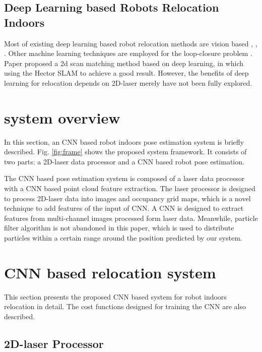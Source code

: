 \documentclass[journal]{IEEEtran}
\begin{document}
\subsection{Deep Learning based Robots Relocation Indoors }

Most of existing deep learning based robot relocation methods are vision based  \cite{kendall2015posenet}, \cite{kuse2019learning}, \cite{zhou2017unsupervised}. Other machine learning techniques are employed for the loop-closure problem \cite{yin2018synchronous}  \cite{chen2017deep}. Paper \cite{li2017deep} proposed a 2d scan matching method based on deep learning, in which using the Hector SLAM \cite{kohlbrecher2011flexible} to achieve a good result. However, the benefits of deep learning for relocation depends on 2D-laser merely have not been fully explored.

\section{system overview}

In this section, an CNN based robot indoors pose estimation system is briefly described. Fig. \ref{fig:frame}  shows the proposed system framework. It consists of two parts: a 2D-laser data processor and a CNN based robot pose estimation.

The CNN based pose estimation system is composed of a laser data processor with a CNN based point cloud feature extraction. The laser processor is designed to process 2D-laser data into images and occupancy grid maps, which is a novel technique to add features of the input of CNN. A CNN is designed to extract features from multi-channel images processed form laser data. Meanwhile, particle filter algorithm is not abandoned in this paper, which is used to distribute particles within a certain range around the position predicted by our system.

\section{CNN based relocation system}

This section presents the proposed CNN based system for robot  indoors relocation in detail. The cost functions designed for training the CNN are also described.


\subsection{2D-laser Processor}
\end{document}
